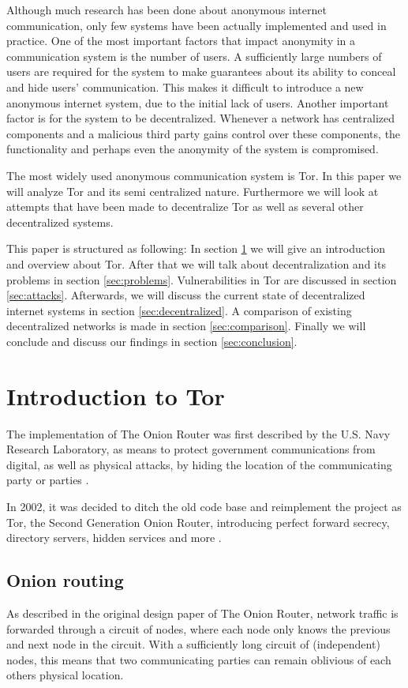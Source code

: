 \documentclass[journal]{IEEEtran}
\begin{document}
	Although much research has been done about anonymous internet communication, only few systems have been actually implemented and used in practice. One of the most important factors that impact anonymity in a communication system is the number of users. A sufficiently large numbers of users are required for the system to make guarantees about its ability to conceal and hide users' communication. This makes it difficult to introduce a new anonymous internet system, due to the initial lack of users. Another important factor is for the system to be decentralized. Whenever a network has centralized components and a malicious third party gains control over these components, the functionality and perhaps even the anonymity of the system is compromised.
	
	The most widely used anonymous communication system is Tor. In this paper we will analyze Tor and its semi centralized nature. Furthermore we will look at attempts that have been made to decentralize Tor as well as several other decentralized systems.
	
	This paper is structured as following: In section \ref{sec:tor} we will give an introduction and overview about Tor. After that we will talk about decentralization and its problems in section \ref{sec:problems}. Vulnerabilities in Tor are discussed in section \ref{sec:attacks}. Afterwards, we will discuss the current state of decentralized internet systems in section \ref{sec:decentralized}. A comparison of existing decentralized networks is made in section \ref{sec:comparison}. Finally we will conclude and discuss our findings in section \ref{sec:conclusion}.
	
\section{Introduction to Tor}
	\label{sec:tor}
	The implementation of The Onion Router was first described by the U.S. Navy Research Laboratory, as means to protect government communications from digital, as well as physical attacks, by hiding the location of the communicating party or parties \cite{goldschlag1996hiding}.

	In 2002, it was decided to ditch the old code base and reimplement the project as Tor, the Second Generation Onion Router, introducing perfect forward secrecy, directory servers, hidden services and more \cite{dingledine2004tor}.
		
	\subsection{Onion routing}
		As described in the original design paper of The Onion Router, network traffic is forwarded through a circuit of nodes, where each node only knows the previous and next node in the circuit. With a sufficiently long circuit of (independent) nodes, this means that two communicating parties can remain oblivious of each others physical location.
					
\end{document}
